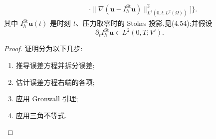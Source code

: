 \begin{theorem}
\begin{equation}
\begin{aligned}
  &\qquad\quad\cdot\|\nabla(\bm{u}-I_h^{\mathrm{St}}\bm{u})\|_{L^4(0,t;L^2(\Omega))}^2
    \Biggr]\Biggr\}.
\end{aligned}
\end{equation}
其中 $I_h^{\mathrm{St}}\bm{u}(t)$ 是时刻 $t$、压力取零时的 Stokes 投影,见(4.54);并假设
\begin{equation}\label{eq:time-dependent-fem-stokes-projection-regularity}
  \partial_t I_h^{\mathrm{St}}\bm{u}\in L^2(0,T;V').
\end{equation}
\begin{proof}
证明分为以下几步:
\begin{enumerate}
  \item 推导误差方程并拆分误差;
  \item 估计误差方程右端的各项;
  \item 应用 Gronwall 引理;
  \item 应用三角不等式.
\end{enumerate}


\end{proof}
\end{theorem}
